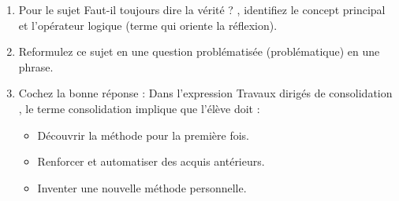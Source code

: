 \documentclass[11pt]{article}
\begin{document}
\begin{exercice}
\begin{enumerate}
    \item Pour le sujet \og Faut-il toujours dire la vérité ? \fg, identifiez le concept principal et l'opérateur logique (terme qui oriente la réflexion).
    \item Reformulez ce sujet en une question problématisée (problématique) en une phrase.
    \item Cochez la bonne réponse : Dans l'expression \og Travaux dirigés de consolidation \fg, le terme \og consolidation \fg implique que l'élève doit :
    \begin{itemize}
        \item[A.] Découvrir la méthode pour la première fois.
        \item[B.] Renforcer et automatiser des acquis antérieurs.
        \item[C.] Inventer une nouvelle méthode personnelle.
    \end{itemize}
\end{enumerate}
\end{exercice}
\end{document}
